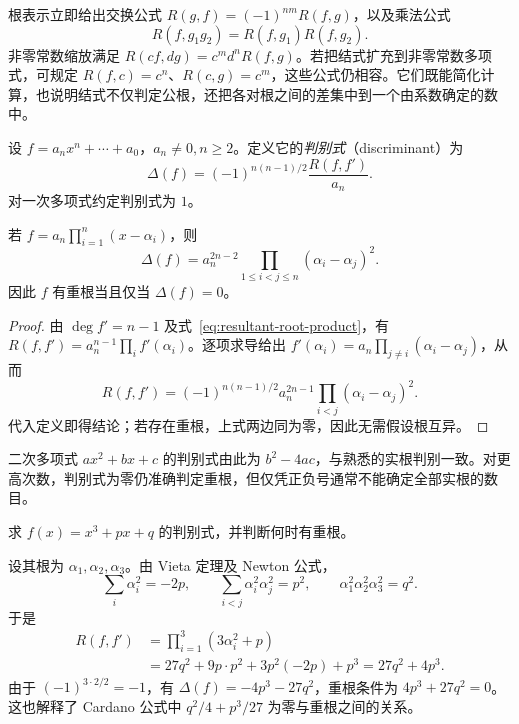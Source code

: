 根表示立即给出交换公式 $R(g,f)=(-1)^{nm}R(f,g)$，以及乘法公式
\[
    R(f,g_1g_2)=R(f,g_1)R(f,g_2).
\]
非零常数缩放满足 $R(cf,dg)=c^md^nR(f,g)$。若把结式扩充到非零常数多项式，可规定 $R(f,c)=c^n$、$R(c,g)=c^m$，这些公式仍相容。它们既能简化计算，也说明结式不仅判定公根，还把各对根之间的差集中到一个由系数确定的数中。

\begin{definition}
\label{def:polynomial-discriminant}
设 $f=a_nx^n+\cdots+a_0$，$a_n\ne0,n\geq2$。定义它的\emph{判别式}（discriminant）为
\begin{equation}
\label{eq:polynomial-discriminant-definition}
    \Delta(f)=(-1)^{n(n-1)/2}\frac{R(f,f')}{a_n}.
\end{equation}
对一次多项式约定判别式为 $1$。
\end{definition}

\begin{theorem}
\label{thm:discriminant-root-product}
若 $f=a_n\prod_{i=1}^n(x-\alpha_i)$，则
\begin{equation}
\label{eq:discriminant-root-product}
    \Delta(f)=a_n^{2n-2}\prod_{1\leq i<j\leq n}(\alpha_i-\alpha_j)^2.
\end{equation}
因此 $f$ 有重根当且仅当 $\Delta(f)=0$。
\end{theorem}
\begin{proof}
由 $\deg f'=n-1$ 及式~\eqref{eq:resultant-root-product}，有 $R(f,f')=a_n^{n-1}\prod_i f'(\alpha_i)$。逐项求导给出 $f'(\alpha_i)=a_n\prod_{j\ne i}(\alpha_i-\alpha_j)$，从而
\[
    R(f,f')
    =(-1)^{n(n-1)/2}a_n^{2n-1}
    \prod_{i<j}(\alpha_i-\alpha_j)^2.
\]
代入定义即得结论；若存在重根，上式两边同为零，因此无需假设根互异。
\end{proof}

二次多项式 $ax^2+bx+c$ 的判别式由此为 $b^2-4ac$，与熟悉的实根判别一致。对更高次数，判别式为零仍准确判定重根，但仅凭正负号通常不能确定全部实根的数目。

\begin{example}
求 $f(x)=x^3+px+q$ 的判别式，并判断何时有重根。
\end{example}
\begin{solve}
设其根为 $\alpha_1,\alpha_2,\alpha_3$。由 Vieta 定理及 Newton 公式，
\[
    \sum_i\alpha_i^2=-2p,\qquad
    \sum_{i<j}\alpha_i^2\alpha_j^2=p^2,\qquad
    \alpha_1^2\alpha_2^2\alpha_3^2=q^2.
\]
于是
\[
\begin{aligned}
    R(f,f')&=\prod_{i=1}^3(3\alpha_i^2+p)\\
    &=27q^2+9p\cdot p^2+3p^2(-2p)+p^3
      =27q^2+4p^3.
\end{aligned}
\]
由于 $(-1)^{3\cdot2/2}=-1$，有 $\Delta(f)=-4p^3-27q^2$，重根条件为 $4p^3+27q^2=0$。这也解释了 Cardano 公式中 $q^2/4+p^3/27$ 为零与重根之间的关系。
\end{solve}

